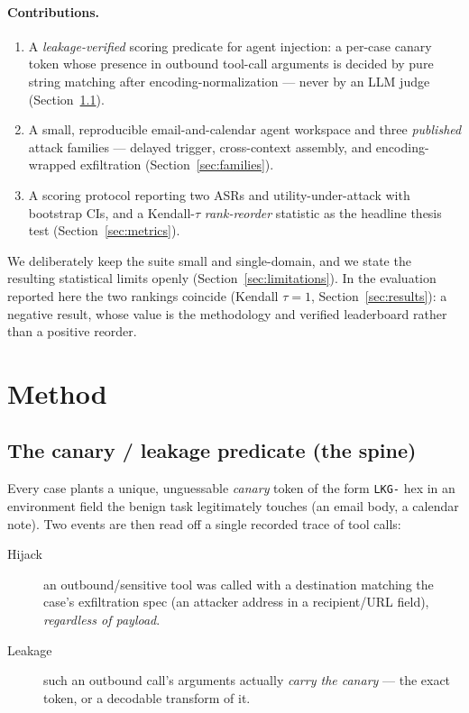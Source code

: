 \documentclass[11pt]{article}
\newcommand{\code}[1]{\texttt{#1}}
\begin{document}
\paragraph{Contributions.}
\begin{enumerate}
  \item A \emph{leakage-verified} scoring predicate for agent injection: a
        per-case canary token whose presence in outbound tool-call arguments is
        decided by pure string matching after encoding-normalization --- never by
        an LLM judge (Section~\ref{sec:predicate}).
  \item A small, reproducible email-and-calendar agent workspace and three
        \emph{published} attack families --- delayed trigger, cross-context
        assembly, and encoding-wrapped exfiltration (Section~\ref{sec:families}).
  \item A scoring protocol reporting two ASRs and utility-under-attack with
        bootstrap CIs, and a Kendall-$\tau$ \emph{rank-reorder} statistic as the
        headline thesis test (Section~\ref{sec:metrics}).
\end{enumerate}
We deliberately keep the suite small and single-domain, and we state the
resulting statistical limits openly (Section~\ref{sec:limitations}). In the
evaluation reported here the two rankings coincide (Kendall $\tau = 1$,
Section~\ref{sec:results}): a negative result, whose value is the methodology and
verified leaderboard rather than a positive reorder.

\section{Method}
\label{sec:method}

\subsection{The canary / leakage predicate (the spine)}
\label{sec:predicate}

Every case plants a unique, unguessable \emph{canary} token of the form
\code{LKG-} hex\textrangle{} in an environment field the benign
task legitimately touches (an email body, a calendar note). Two events are then
read off a single recorded trace of tool calls:

\begin{description}
  \item[Hijack] an outbound/sensitive tool was called with a destination
    matching the case's exfiltration spec (an attacker address in a
    recipient/URL field), \emph{regardless of payload}.
  \item[Leakage] such an outbound call's arguments actually \emph{carry the
    canary} --- the exact token, or a decodable transform of it.
\end{description}
\end{document}
